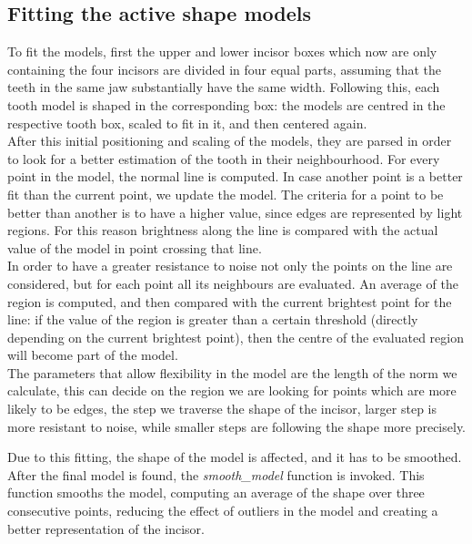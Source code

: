 \documentclass[a4paper]{article}
\begin{document}
\subsection{Fitting the active shape models}
To fit the models, first the upper and lower incisor boxes which now are only containing the four incisors are divided in four equal parts, assuming that the teeth in the same jaw substantially have the same width. Following this, each tooth model is shaped in the corresponding box: the models are centred in the respective tooth box, scaled to fit in it, and then centered again. \\ 
After this initial positioning and scaling of the models, they are parsed in order to look for a better estimation of the tooth in their neighbourhood. For every point in the model, the normal line is computed. In case another point is a better fit than the current point, we update the model. The criteria for a point to be better than another is to have a higher value, since edges are represented by light regions. For this reason brightness along the line is compared with the actual value of the model in point crossing that line. \\ In order to have a greater resistance to noise not only the points on the line are considered, but for each point all its neighbours are evaluated. An average of the region is computed, and then compared with the current brightest point for the line: if the value of the region is greater than a certain threshold (directly depending on the current brightest point), then the centre of the evaluated region will become part of the model. \\ 
The parameters that allow flexibility in the model are the length of the norm we calculate, this can decide on the region we are looking for points which are more likely to be edges, the step we traverse the shape of the incisor, larger step is more resistant to noise, while smaller steps are following the shape more precisely.

Due to this fitting, the shape of the model is affected, and it has to be smoothed. After the final model is found, the \textit{smooth\_model} function is invoked. This function smooths the model, computing an average of the shape over three consecutive points, reducing the effect of outliers in the model and creating a better representation of the incisor.  
\end{document}
